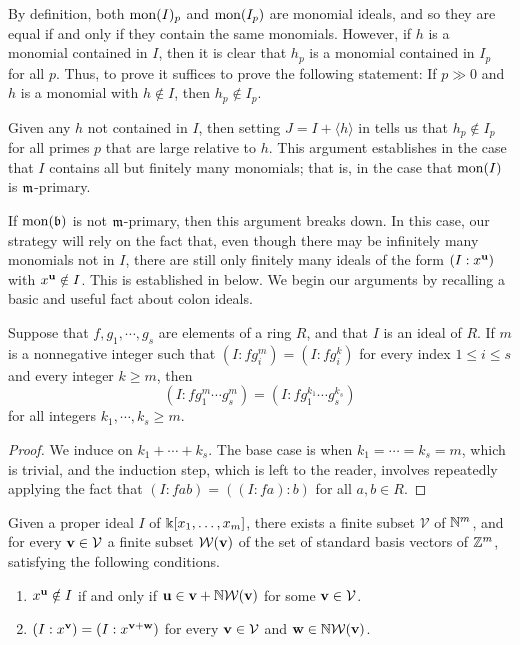 \documentclass[11pt]{amsart}
\begin{document}
By definition, both $\operatorname{mon}(I)_p$ and $\operatorname{mon}(I_p)$ are monomial ideals, and so they are equal if and only if they contain the same monomials.  However, if $h$ is a monomial contained in $I$, then it is clear that $h_p$ is a monomial contained in $I_p$ for all $p$.  Thus, to prove  it suffices to prove the following statement:  If $p \gg 0$ and $h$ is a monomial with $h \notin I$, then $h_p \notin I_p$.

Given any $h$ not contained in $I$, then setting $J = I + \langle h \rangle$ in  tells us that $h_p \notin I_p$ for all primes $p$ that are large relative to $h$.  This argument establishes  in the case that $I$ contains all but finitely many monomials;  that is, in the case that $ \operatorname{mon}(I)$ is $\mathfrak{m}$-primary.

If $\operatorname{mon}(\mathfrak{b})$ is not $\mathfrak{m}$-primary, then this argument breaks down.  In this case, our strategy will rely on the fact that, even though there may be infinitely many monomials not in $I$, there are still only finitely many ideals of the form $(I:x^{\mathbf{u}})$ with $x^{\mathbf{u}} \notin I$.    This is established in  below.  We begin our arguments by recalling a basic and useful fact about colon ideals.




\begin{lemma}
\label{colon-product-stabilization: L}
  Suppose that $f,g_1, \cdots, g_s$ are elements of a ring $R$, and that $I$ is an ideal of $R$.
If $m$ is a nonnegative integer such that $(I: f g_i^m) = (I: f g_i^k)$ for every index $1 \leq i \leq s$ and every integer $k \geq m$, then \[ (I: f g_1^m \cdots g_s^m) = (I: f g_1^{k_1} \cdots g_s^{k_s})\] for all integers $k_1, \cdots, k_s \geq m$.
\end{lemma}

\begin{proof}
We induce on $k_1 + \cdots + k_s$.  The base case is when $k_1 = \cdots = k_s = m$, which is trivial, and the induction step, which is left to the reader, involves repeatedly applying the fact that $(I:fab) = ((I:fa):b)$ for all $a,b \in R$.
\end{proof}

\begin{lemma}
\label{monomial-noetherian-decomposition: L}
Given a proper ideal $I$ of $\Bbbk[x_1, \ldots, x_m]$, there exists a finite subset $\mathcal{V}$ of $\mathbb{N}^m$, and for every $\mathbf{v} \in \mathcal{V}$ a finite subset $\mathcal{W}(\mathbf{v})$ of the set of standard basis vectors of $\mathbb{Z}^m$,  satisfying the following conditions.
\begin{enumerate}
\item $x^{\mathbf{u}} \notin I$ if and only if $\mathbf{u} \in \mathbf{v} + \mathbb{N} \mathcal{W}(\mathbf{v})$ for some $\mathbf{v} \in \mathcal{V}$.
\item $(I:x^{\mathbf{v}}) = (I: x^{\mathbf{v}+\mathbf{w}})$ for every $\mathbf{v} \in \mathcal{V}$ and $\mathbf{w} \in  \mathbb{N}  \mathcal{W}(\mathbf{v})$.
\end{enumerate}
\end{lemma}
\end{document}
